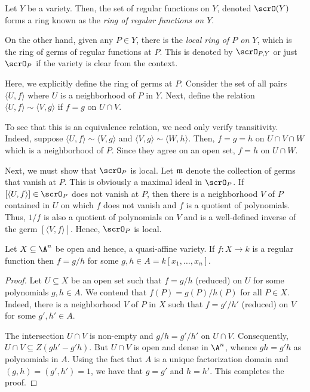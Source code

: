 \begin{definition}
    Let $Y$ be a variety. Then, the set of regular functions on $Y$, denoted $\scrO(Y)$ forms a ring known as the \emph{ring of regular functions on $Y$}.

    On the other hand, given any $P\in Y$, there is the \emph{local ring of $P$ on $Y$}, which is the ring of germs of regular functions at $P$. This is denoted by $\scrO_{P, Y}$ or just $\scrO_P$ if the variety is clear from the context.
\end{definition}

\begin{remark}
    Here, we explicitly define the ring of germs at $P$. Consider the set of all pairs $\langle U, f\rangle$ where $U$ is a neighborhood of $P$ in $Y$. Next, define the relation $\langle U, f\rangle\sim\langle V, g\rangle$ if $f = g$ on $U\cap V$. 

    To see that this is an equivalence relation, we need only verify transitivity. Indeed, suppose $\langle U, f\rangle\sim\langle V,g\rangle$ and $\langle V, g\rangle\sim\langle W, h\rangle$. Then, $f = g = h$ on $U\cap V\cap W$ which is a neighborhood of $P$. Since they agree on an open set, $f = h$ on $U\cap W$.

    Next, we must show that $\scrO_P$ is local. Let $\mathfrak m$ denote the collection of germs that vanish at $P$. This is obviously a maximal ideal in $\scrO_P$. If $[\langle U, f\rangle]\in\scrO_P$ does not vanish at $P$, then there is a neighborhood $V$ of $P$ contained in $U$ on which $f$ does not vanish and $f$ is a quotient of polynomials. Thus, $1/f$ is also a quotient of polynomials on $V$ and is a well-defined inverse of the germ $[\langle V, f\rangle]$. Hence, $\scrO_P$ is local.
\end{remark}

\begin{lemma}
    Let $X\subseteq\A^n$ be open and hence, a quasi-affine variety. If $f: X\to k$ is a regular function then $f = g/h$ for some $g,h\in A = k[x_1,\dots,x_n]$.
\end{lemma}
\begin{proof}
    Let $U\subseteq X$ be an open set such that $f = g/h$ (reduced) on $U$ for some polynomials $g,h\in A$. We contend that $f(P) = g(P)/h(P)$ for all $P\in X$. Indeed, there is a neighborhood $V$ of $P$ in $X$ such that $f = g'/h'$ (reduced) on $V$ for some $g', h'\in A$.

    The intersection $U\cap V$ is non-empty and $g/h = g'/h'$ on $U\cap V$. Consequently, $U\cap V\subseteq Z(gh' - g'h)$. But $U\cap V$ is open and dense in $\A^n$, whence $gh = g'h$ as polynomials in $A$. Using the fact that $A$ is a unique factorization domain and $(g, h) = (g', h') = 1$, we have that $g = g'$ and $h = h'$. This completes the proof.
\end{proof}

